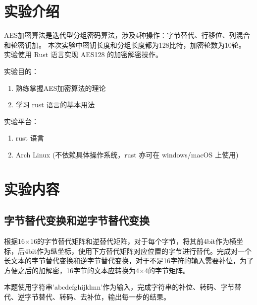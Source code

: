 \documentclass[degree=project,degree-type=project,cjk-font=noto]{thuthesis}
\begin{document}
\maketitle

\frontmatter
% 



\mainmatter

\chapter{实验介绍}
AES加密算法是迭代型分组密码算法，涉及4种操作：字节替代、行移位、列混合和轮密钥加。
本次实验中密钥长度和分组长度都为128比特，加密轮数为10轮。
实验使用 Rust 语言实现 AES128 的加密解密操作。

实验目的：

\begin{enumerate}
    \item 熟练掌握AES加密算法的理论
    \item 学习 rust 语言的基本用法
\end{enumerate}

实验平台：

\begin{enumerate}
    \item rust 语言
    \item Arch Linux (不依赖具体操作系统，rust 亦可在 windows/macOS 上使用)
\end{enumerate}

\chapter{实验内容}

\section{字节替代变换和逆字节替代变换}

    根据16×16的字节替代矩阵和逆替代矩阵，对于每个字节，将其前4bit作为横坐标，后4bit作为纵坐标，使用下方替代矩阵对应位置的字节进行替代。完成对一个长文本的字节替代变换和逆字节替代变换，对于不足16字符的输入需要补位，为了方便之后的加解密，16字节的文本应转换为4×4的字节矩阵。

本题使用字符串'abcdefghijklmn'作为输入，完成字符串的补位、转码、字节替代、逆字节替代、转码、去补位，输出每一步的结果。
\end{document}
